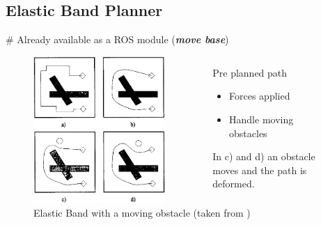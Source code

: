 \documentclass[]{beamer}
\newcommand{\mSlideTitle}{{{\color{gray}\secname}} \# \subsecname}
\begin{document}

\subsection{Elastic Band Planner}
\begin{frame}{\mSlideTitle}
  Already available as a ROS module (\textbf{\emph{move base}})
  \begin{figure}
    \begin{columns}[T,onlytextwidth]
      \begin{column}{0.6\textwidth}
        \centering
        \includegraphics[width=0.8\textwidth]{Eband.png}
      \end{column}
      \begin{column}{0.4\textwidth}
        \vspace{2.0em}
        Pre planned path
        \begin{itemize}
          \item Forces applied
          \item Handle moving obstacles
        \end{itemize}
        In c) and d) an obstacle moves and the path is deformed.
      \end{column}
    \end{columns}
    \caption{Elastic Band with a moving obstacle (taken from \cite{eband})}
  \end{figure}
\end{frame}
\end{document}
